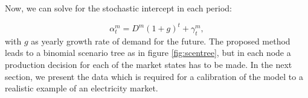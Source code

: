 Now, we can solve for the stochastic intercept in each period:

\begin{equation}
  \alpha^m_t=D^m(1+g)^t+\gamma^m_t,
\end{equation}
with $g$ as yearly growth rate of demand for the future. The proposed method leads to a binomial scenario tree as in figure \ref{fig:scentree}, but in each node a production decision for each of the market states has to be made. In the next section, we present the data which is required for a calibration of the model to a realistic example of an electricity market.

